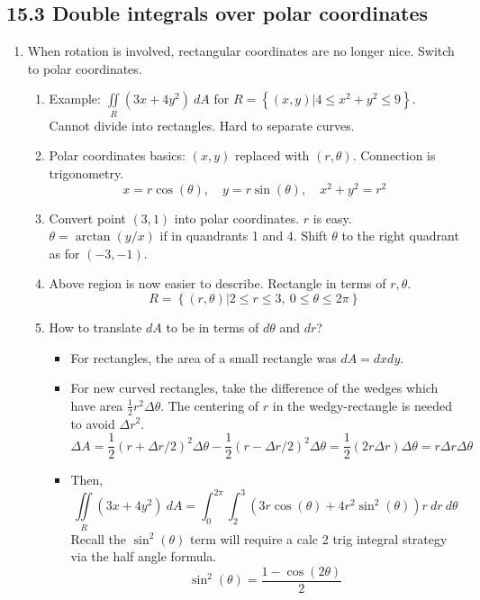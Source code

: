 \documentclass{article}
\begin{document}
\subsection{15.3 Double integrals over polar coordinates}
\begin{enumerate}

\item When rotation is involved, rectangular coordinates are no longer nice. Switch to polar coordinates.
\begin{enumerate}
\item Example: $\iint\limits_R (3x+4y^2) ~dA$ for $R = \left\{ (x,y) | 4 \leq x^2+y^2 \leq 9 \right\}$. Cannot divide into rectangles. Hard to separate curves.
\item Polar coordinates basics: $(x,y)$ replaced with $(r, \theta)$. Connection is trigonometry.
\[
x = r\cos(\theta), \quad y=r\sin(\theta), \quad x^2+y^2=r^2
\]
\item Convert point $(3,1)$ into polar coordinates. $r$ is easy. $\theta = \arctan(y/x)$ if in quandrants 1 and 4. Shift $\theta$ to the right quadrant as for $(-3,-1)$.
\item Above region is now easier to describe. Rectangle in terms of $r,\theta$.
\[
R = \left\{ (r,\theta) | 2 \leq r \leq 3, ~ 0 \leq \theta \leq 2\pi \right\}
\]
\item How to translate $dA$ to be in terms of $d\theta$ and $dr$?
\begin{itemize}
\item For rectangles, the area of a small rectangle was $dA = dx dy$.
\item For new curved rectangles, take the difference of the wedges which have area $\frac{1}{2}r^2 \Delta \theta$. The centering of $r$ in the wedgy-rectangle is needed to avoid $\Delta r^2$.
\[
\Delta A = \frac{1}{2}(r+\Delta r/2)^2 \Delta \theta - \frac{1}{2}(r-\Delta r/2)^2 \Delta \theta = \frac{1}{2} (2r\Delta r) \Delta \theta = r\Delta r \Delta \theta
\] 
\item Then, 
\[
\iint\limits_R (3x+4y^2) ~dA = \int_0^{2\pi} \int_2^3 (3r\cos(\theta)+4r^2\sin^2(\theta)) r~dr~d\theta
\]
Recall the $\sin^2(\theta)$ term will require a calc 2 trig integral strategy via the half angle formula.
\[
\sin^2(\theta) = \frac{1-\cos(2\theta)}{2}
\]
\end{itemize}
\end{enumerate}


\end{enumerate}
\end{document}
